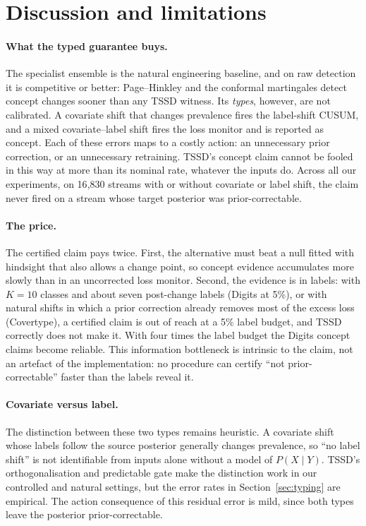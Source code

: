 \section{Discussion and limitations}
\label{sec:discuss}

\paragraph{What the typed guarantee buys.} The specialist ensemble is the natural engineering baseline, and on raw detection it is competitive or better: Page--Hinkley and the conformal martingales detect concept changes sooner than any TSSD witness. Its \emph{types}, however, are not calibrated. A covariate shift that changes prevalence fires the label-shift CUSUM, and a mixed covariate--label shift fires the loss monitor and is reported as concept. Each of these errors maps to a costly action: an unnecessary prior correction, or an unnecessary retraining. TSSD's concept claim cannot be fooled in this way at more than its nominal rate, whatever the inputs do. Across all our experiments, on 16{,}830 streams with or without covariate or label shift, the claim never fired on a stream whose target posterior was prior-correctable.

\paragraph{The price.} The certified claim pays twice. First, the alternative must beat a null fitted with hindsight that also allows a change point, so concept evidence accumulates more slowly than in an uncorrected loss monitor. Second, the evidence is in labels: with $K=10$ classes and about seven post-change labels (Digits at 5\%), or with natural shifts in which a prior correction already removes most of the excess loss (Covertype), a certified claim is out of reach at a 5\% label budget, and TSSD correctly does not make it. With four times the label budget the Digits concept claims become reliable. This information bottleneck is intrinsic to the claim, not an artefact of the implementation: no procedure can certify ``not prior-correctable'' faster than the labels reveal it.

\paragraph{Covariate versus label.} The distinction between these two types remains heuristic. A covariate shift whose labels follow the source posterior generally changes prevalence, so ``no label shift'' is not identifiable from inputs alone without a model of $P(X\mid Y)$. TSSD's orthogonalisation and predictable gate make the distinction work in our controlled and natural settings, but the error rates in Section~\ref{sec:typing} are empirical. The action consequence of this residual error is mild, since both types leave the posterior prior-correctable.

